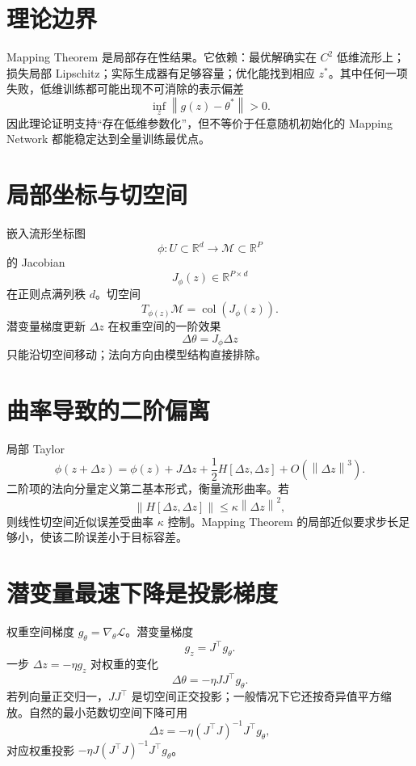 \documentclass[UTF8,12pt,a4paper,fontset=none]{ctexart}
\numberwithin{equation}{section}
\newcommand{\R}{\mathbb{R}}
\newcommand{\Loss}{\mathcal{L}}
\newcommand{\norm}[1]{\left\lVert #1\right\rVert}
\begin{document}
\section{理论边界}
Mapping Theorem 是局部存在性结果。它依赖：最优解确实在 $C^2$ 低维流形上；损失局部 Lipschitz；实际生成器有足够容量；优化能找到相应 $z^*$。其中任何一项失败，低维训练都可能出现不可消除的表示偏差
\begin{equation}
 \inf_z\norm{g(z)-\theta^*}>0.
\end{equation}
因此理论证明支持“存在低维参数化”，但不等价于任意随机初始化的 Mapping Network 都能稳定达到全量训练最优点。

\section{局部坐标与切空间}
嵌入流形坐标图
\begin{equation}
 \phi:U\subset\R^d\to\mathcal M\subset\R^P
\end{equation}
的 Jacobian
\begin{equation}
 J_\phi(z)\in\R^{P\times d}
\end{equation}
在正则点满列秩 $d$。切空间
\begin{equation}
 T_{\phi(z)}\mathcal M=\operatorname{col}(J_\phi(z)).
\end{equation}
潜变量梯度更新 $\Delta z$ 在权重空间的一阶效果
\begin{equation}
 \Delta\theta=J_\phi\Delta z
\end{equation}
只能沿切空间移动；法向方向由模型结构直接排除。

\section{曲率导致的二阶偏离}
局部 Taylor
\begin{equation}
 \phi(z+\Delta z)=\phi(z)+J\Delta z+\frac12H[\Delta z,\Delta z]+O(\norm{\Delta z}^3).
\end{equation}
二阶项的法向分量定义第二基本形式，衡量流形曲率。若
\begin{equation}
 \norm{H[\Delta z,\Delta z]}\le\kappa\norm{\Delta z}^2,
\end{equation}
则线性切空间近似误差受曲率 $\kappa$ 控制。Mapping Theorem 的局部近似要求步长足够小，使该二阶误差小于目标容差。

\section{潜变量最速下降是投影梯度}
权重空间梯度 $g_\theta=\nabla_\theta\Loss$。潜变量梯度
\begin{equation}
 g_z=J^\top g_\theta.
\end{equation}
一步 $\Delta z=-\eta g_z$ 对权重的变化
\begin{equation}
 \Delta\theta=-\eta JJ^\top g_\theta.
\end{equation}
若列向量正交归一，$JJ^\top$ 是切空间正交投影；一般情况下它还按奇异值平方缩放。自然的最小范数切空间下降可用
\begin{equation}
 \Delta z=-\eta(J^\top J)^{-1}J^\top g_\theta,
\end{equation}
对应权重投影 $-\eta J(J^\top J)^{-1}J^\top g_\theta$。
\end{document}
